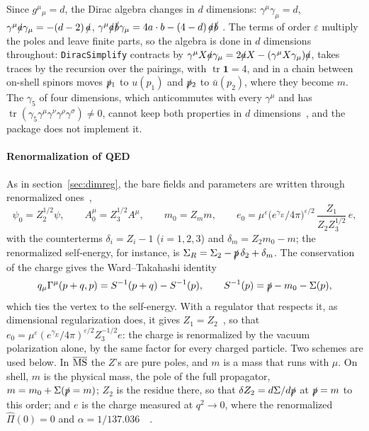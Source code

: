 \documentclass[11pt,a4paper]{article}
\newcommand{\pkg}[1]{\texttt{#1}}
\begin{document}
Since $g^\mu{}_\mu=d$, the Dirac algebra changes in $d$ dimensions: $\gamma^\mu\gamma_\mu=d$,
$\gamma^\mu\slashed{a}\gamma_\mu=-(d-2)\,\slashed{a}$, $\gamma^\mu\slashed{a}\slashed{b}\gamma_\mu=4a\cdot b-(4-d)\,\slashed{a}\slashed{b}$
\cite[appendix~A.4]{PeskinSchroeder}. The terms of order $\varepsilon$ multiply the poles and leave finite parts, so the
algebra is done in $d$ dimensions throughout: \pkg{DiracSimplify} contracts by
$\gamma^\mu X\slashed{a}\gamma_\mu=2\slashed{a}X-(\gamma^\mu X\gamma_\mu)\slashed{a}$, takes traces by the recursion over the
pairings, with $\operatorname{tr}\mathbf 1=4$, and in a chain between on-shell spinors moves $\slashed{p}{}_1$ to
$u(p_1)$ and $\slashed{p}{}_2$ to $\bar u(p_2)$, where they become $m$. The $\gamma_5$ of four dimensions, which anticommutes
with every $\gamma^\mu$ and has $\operatorname{tr}(\gamma_5\gamma^\mu\gamma^\nu\gamma^\rho\gamma^\sigma)\neq0$, cannot keep both
properties in $d$ dimensions~\cite{tHooftVeltman1972,BreitenlohnerMaison1977}, and the package does not implement it.

\paragraph{Renormalization of QED} As in section~\ref{sec:dimreg}, the bare fields and parameters are written through
renormalized ones~\cite[section~10.3]{PeskinSchroeder},
\[
\psi_0=Z_2^{1/2}\psi,\qquad A_0^\mu=Z_3^{1/2}A^\mu,\qquad m_0=Z_mm,\qquad
e_0=\mu^\varepsilon\bigl(e^{\gamma_E}/4\pi\bigr)^{\varepsilon/2}\,\frac{Z_1}{Z_2Z_3^{1/2}}\,e ,
\]
with the counterterms $\delta_i=Z_i-1$ ($i=1,2,3$) and $\delta_m=Z_2m_0-m$; the renormalized self-energy, for instance, is
$\Sigma_R=\Sigma_2-\slashed{p}\,\delta_2+\delta_m$. The conservation of the charge gives the Ward--Takahashi
identity~\cite{Ward1950,Takahashi1957}
\[
q_\mu\Gamma^\mu(p+q,p)=S^{-1}(p+q)-S^{-1}(p),\qquad S^{-1}(p)=\slashed{p}-m_0-\Sigma(p),
\]
which ties the vertex to the self-energy. With a regulator that respects it, as dimensional regularization does, it gives
$Z_1=Z_2$~\cite[section~7.4]{PeskinSchroeder}, so that $e_0=\mu^\varepsilon(e^{\gamma_E}/4\pi)^{\varepsilon/2}Z_3^{-1/2}e$:
the charge is renormalized by the vacuum polarization alone, by the same factor for every charged particle. Two schemes are
used below. In $\overline{\rm MS}$ the $Z$'s are pure poles, and $m$ is a mass that runs with $\mu$. On shell, $m$ is the
physical mass, the pole of the full propagator, $m=m_0+\Sigma(\slashed{p}=m)$; $Z_2$ is the residue there, so that
$\delta Z_2=d\Sigma/d\slashed{p}$ at $\slashed{p}=m$ to this order; and $e$ is the charge measured at $q^2\to0$, where the
renormalized $\hat\Pi(0)=0$ and $\alpha=1/137.036$~\cite[sections~7.1 and 7.5]{PeskinSchroeder}~\cite{Grozin2005}.
\end{document}
